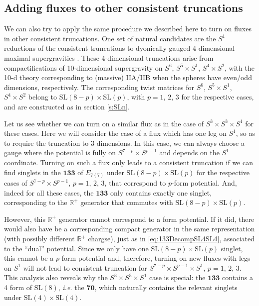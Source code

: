 \documentclass[a4paper, 11pt]{article}
\numberwithin{equation}{section}
\newcommand{\SL}[1]{\mathrm{SL}( #1 )}
\newcommand{\En}[1]{E_{#1(#1)}}
\newcommand{\mbf}[1]{\mathbf{#1}}
\newcommand{\+}{\oplus}
\begin{document}
\subsection{Adding fluxes to other consistent truncations}
We can also try to apply the same procedure we described here to turn on fluxes in other consistent truncations. One set of natural candidates are the $S^1$ reductions of the consistent truncations to dyonically gauged 4-dimensional maximal supergravities \cite{Guarino:2015jca,Inverso:2016eet}. These 4-dimensional truncations arise from compactifications of 10-dimensional supergravity on $S^6$, $S^5\times S^1$, $S^4\times S^2$, with the 10-d theory corresponding to (massive) IIA/IIB when the spheres have even/odd dimensions, respectively. The corresponding twist matrices for $S^6$, $S^5\times S^1$, $S^4\times S^2$ belong to $\SL{8-p} \times \SL{p}$, with $p = 1,\, 2,\, 3$ for the respective cases, and are constructed as in section \ref{s:SLn}.

Let us see whether we can turn on a similar flux as in the case of $S^3 \times S^3 \times S^1$ for these cases. Here we will consider the case of a flux which has one leg on $S^1$, so as to require the truncation to 3 dimensions. In this case, we can always choose a gauge where the potential is fully on $S^{7-p} \times S^{p-1}$ and depends on the $S^1$ coordinate. Turning on such a flux only leads to a consistent truncation if we can find singlets in the $\mbf{133}$ of $\En{7}$ under $\SL{8-p} \times \SL{p}$ for the respective cases of $S^{7-p} \times S^{p-1}$, $p = 1,\, 2,\, 3$, that correspond to $p$-form potential. And, indeed for all these cases, the $\mbf{133}$ only contains exactly one singlet, corresponding to the $\mathbb{R}^+$ generator that commutes with $\SL{8-p} \times \SL{p}$.

However, this $\mathbb{R}^+$ generator cannot correspond to a form potential. If it did, there would also have be a corresponding compact generator in the same representation (with possibly different $\mathbb{R}^+$ chargse), just as in \eqref{eq:133DecompSL4SL4}, associated to the ``dual'' potential. Since we only have one $\SL{8-p} \times \SL{p}$ singlet, this cannot be a $p$-form potential and, therefore, turning on new fluxes with legs on $S^1$ will not lead to consistent truncation for $S^{7-p} \times S^{p-1} \times S^1$, $p = 1,\, 2,\, 3$. This analysis also reveals why the $S^3\times S^3 \times S^1$ case is special: the $\mbf{133}$ contains a 4 form of $\SL{8}$, \textit{i.e.} the $\mathbf{70}$, which naturally contains the relevant singlets under $\SL{4}\times \SL{4}$.
\end{document}
